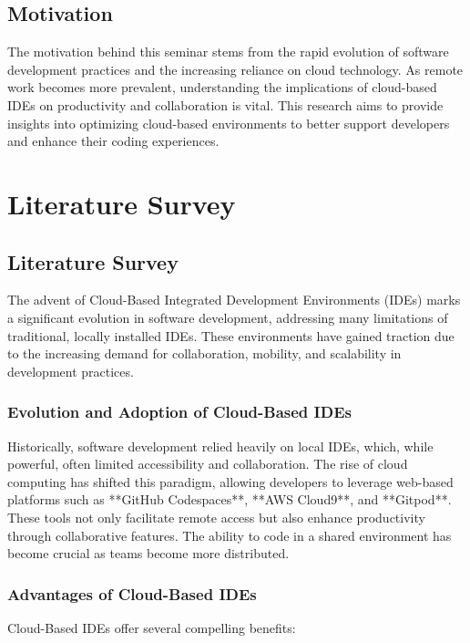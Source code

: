 \documentclass[12pt,a4paper,final]{report}
\begin{document}
\section{Motivation}
The motivation behind this seminar stems from the rapid evolution of software development practices and the increasing reliance on cloud technology. As remote work becomes more prevalent, understanding the implications of cloud-based IDEs on productivity and collaboration is vital. This research aims to provide insights into optimizing cloud-based environments to better support developers and enhance their coding experiences.

\chapter{Literature Survey}
\thispagestyle{empty}
\newpage

\section{Literature Survey}

The advent of Cloud-Based Integrated Development Environments (IDEs) marks a significant evolution in software development, addressing many limitations of traditional, locally installed IDEs. These environments have gained traction due to the increasing demand for collaboration, mobility, and scalability in development practices.

\subsection{Evolution and Adoption of Cloud-Based IDEs}
Historically, software development relied heavily on local IDEs, which, while powerful, often limited accessibility and collaboration. The rise of cloud computing has shifted this paradigm, allowing developers to leverage web-based platforms such as **GitHub Codespaces**, **AWS Cloud9**, and **Gitpod**. These tools not only facilitate remote access but also enhance productivity through collaborative features. The ability to code in a shared environment has become crucial as teams become more distributed.

\subsection{Advantages of Cloud-Based IDEs}
Cloud-Based IDEs offer several compelling benefits:
\end{document}
